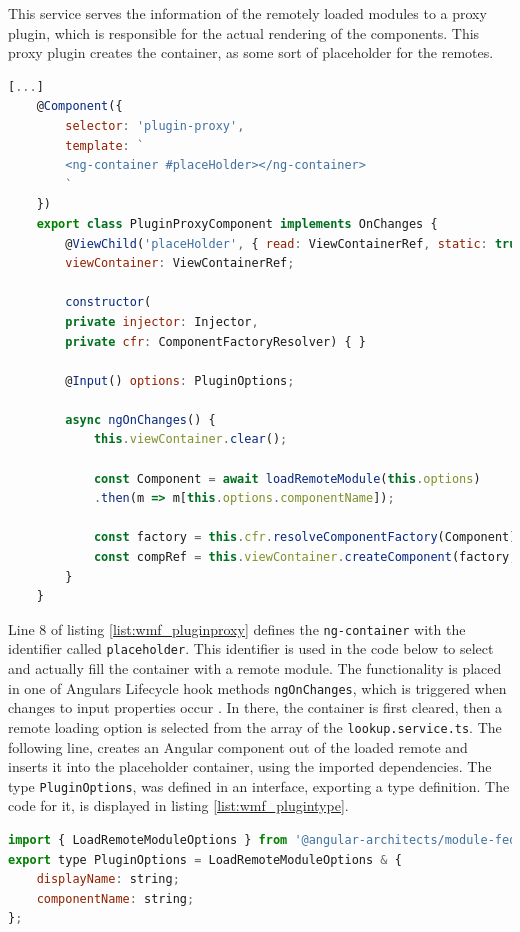 This service serves the information of the remotely loaded modules to a proxy plugin, which is responsible for the actual rendering of the components. This proxy plugin creates the container, as some sort of placeholder for the remotes. \cite{wmf_angular_dynamicfederation}
\newpage
\begin{lstlisting}[language=JavaScript, caption=Content of \texttt{plugin-proxy.component.ts} for remote module loading in shell applications, label=list:wmf_pluginproxy,  xleftmargin=.0\textwidth, xrightmargin=.0\textwidth]
	[...]	
	@Component({
		selector: 'plugin-proxy',
		template: `
		<ng-container #placeHolder></ng-container>
		`
	})
	export class PluginProxyComponent implements OnChanges {
		@ViewChild('placeHolder', { read: ViewContainerRef, static: true })
		viewContainer: ViewContainerRef;
		
		constructor(
		private injector: Injector,
		private cfr: ComponentFactoryResolver) { }
		
		@Input() options: PluginOptions;
		
		async ngOnChanges() {
			this.viewContainer.clear();
			
			const Component = await loadRemoteModule(this.options)
			.then(m => m[this.options.componentName]);
			
			const factory = this.cfr.resolveComponentFactory(Component);
			const compRef = this.viewContainer.createComponent(factory, null, this.injector);		
		}
	}
\end{lstlisting}

Line 8 of listing \ref{list:wmf_pluginproxy} defines the \texttt{ng-container} with the identifier called \texttt{placeholder}. This identifier is used in the code below to select and actually fill the container with a remote module. The functionality is placed in one of Angulars Lifecycle hook methods \texttt{ngOnChanges}, which is triggered when changes to input properties occur \cite{wmf_angular_lifecyclehooks} .
In there, the container is first cleared, then a remote loading option is selected from the array of the \texttt{lookup.service.ts}. The following line, creates an Angular component out of the loaded remote and inserts it into the placeholder container, using the imported dependencies.
The type \texttt{PluginOptions}, was defined in an interface, exporting a type definition. The code for it, is displayed in listing \ref{list:wmf_plugintype}.
\newpage
\begin{lstlisting}[language=JavaScript, caption=Content of \texttt{plugin.ts} for remote module loading in shell applications, label=list:wmf_plugintype,  xleftmargin=.0\textwidth, xrightmargin=.0\textwidth]
import { LoadRemoteModuleOptions } from '@angular-architects/module-federation';
export type PluginOptions = LoadRemoteModuleOptions & {
	displayName: string;
	componentName: string;
};
\end{lstlisting}

